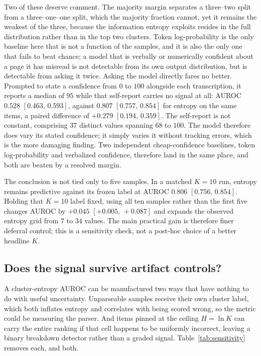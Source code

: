 \documentclass[10pt,twocolumn,letterpaper]{article}
\newcommand{\ci}[2]{{\small$[#1,\,#2]$}}
\begin{document}
Two of these deserve comment. The majority margin separates a
three--two split from a three--one--one split, which the majority
fraction cannot, yet it remains the weakest of the three, because the
information entropy exploits resides in the full distribution rather than
in the top two clusters. Token log-probability is the only baseline here that is not a
function of the samples, and it is also the only one that fails to beat
chance; a model that is verbally or numerically confident about a page it
has misread is not detectable from its own output distribution, but is
detectable from asking it twice.
Asking the model directly fares no better. Prompted to state a confidence
from $0$ to $100$ alongside each transcription, it reports a median of
$95$ while that self-report carries no signal at all: AUROC $0.528$
\ci{0.463}{0.593}, against $0.807$ \ci{0.757}{0.854} for entropy on the
same items, a paired difference of $+0.279$ \ci{0.194}{0.359}. The
self-report is not constant, comprising $37$ distinct values spanning
$68$ to $100$. The model therefore does vary its stated confidence; it
simply varies it without tracking errors, which is the more damaging finding. Two independent
cheap-confidence baselines, token log-probability and verbalized
confidence, therefore land in the same place, and both are beaten by a
resolved margin.

The conclusion is not tied only to five samples. In a matched $K=10$ run,
entropy remains predictive against its frozen label at AUROC $0.806$
\ci{0.756}{0.854}. Holding that $K=10$ label fixed, using all ten samples
rather than the first five changes AUROC by $+0.045$
\ci{+0.005}{+0.087} and expands the observed entropy grid from $7$ to $34$
values. The main practical gain is therefore finer deferral control; this is
a sensitivity check, not a post-hoc choice of a better headline $K$.

\subsection{Does the signal survive artifact controls?}
\label{sec:q2}
A cluster-entropy AUROC can be manufactured two ways that have nothing to
do with useful uncertainty. Unparseable samples receive their own cluster
label, which both inflates entropy and correlates with being scored
wrong, so the metric could be measuring the parser. And items pinned at
the ceiling $H=\ln K$ can carry the entire ranking if that cell happens to
be uniformly incorrect, leaving a binary breakdown detector rather than a
graded signal. Table~\ref{tab:sensitivity} removes each, and both.
\end{document}
